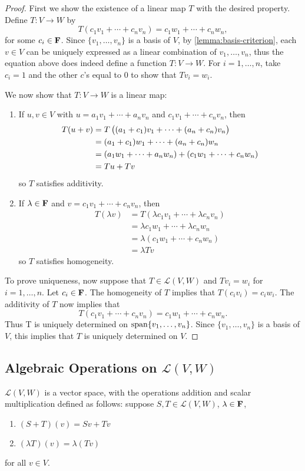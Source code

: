 \begin{proof}
First we show the existence of a linear map $T$ with the desired property. Define $T:V\to W$ by
\[T(c_1v_1+\cdots+c_nv_n)=c_1w_1+\cdots+c_nw_n,\]
for some $c_i\in\mathbf F$. Since $\{v_1,\dots,v_n\}$ is a basis of $V$, by \cref{lemma:basis-criterion}, each $v\in V$ can be uniquely expressed as a linear combination of $v_1,\dots,v_n$, thus the equation above does indeed define a function $T:V\to W$. For $i=1,\dots,n$, take $c_i=1$ and the other $c$'s equal to $0$ to show that $Tv_i=w_i$.

We now show that $T:V\to W$ is a linear map:
\begin{enumerate}[label=(\roman*)]
\item If $u,v\in V$ with $u=a_1v_1+\cdots+a_nv_n$ and $c_1v_1+\cdots+c_nv_n$, then
\begin{align*}
T(u+v)&=T\left((a_1+c_1)v_1+\cdots+(a_n+c_n)v_n\right)\\
&=(a_1+c_1)w_1+\cdots+(a_n+c_n)w_n\\
&=(a_1w_1+\cdots+a_nw_n)+(c_1w_1+\cdots+c_nw_n)\\
&=Tu+Tv
\end{align*}
so $T$ satisfies additivity.

\item If $\lambda\in\mathbf F$ and $v=c_1v_1+\cdots+c_nv_n$, then
\begin{align*}
T(\lambda v)&=T(\lambda c_1v_1+\cdots+\lambda c_nv_n)\\
&=\lambda c_1w_1+\cdots+\lambda c_nw_n\\
&=\lambda(c_1w_1+\cdots+c_nw_n)\\
&=\lambda Tv
\end{align*}
so $T$ satisfies homogeneity.
\end{enumerate}

To prove uniqueness, now suppose that $T\in\mathcal{L}(V,W)$ and $Tv_i=w_i$ for $i=1,\dots,n$. Let $c_i\in\mathbf F$. The homogeneity of $T$ implies that $T(c_iv_i)=c_iw_i$. The additivity of $T$ now implies that 
\[T(c_1v_1+\cdots+c_nv_n)=c_1w_1+\cdots+c_nw_n.\]
Thus T is uniquely determined on $\operatorname{span}\{v_1,\dots,v_n\}$. Since $\{v_1,\dots,v_n\}$ is a basis of $V$, this implies that $T$ is uniquely determined on $V$.
\end{proof}

\subsection{Algebraic Operations on $\mathcal{L}(V,W)$}
\begin{proposition}
$\mathcal{L}(V,W)$ is a vector space, with the operations addition and scalar multiplication defined as follows: suppose $S,T\in\mathcal{L}(V,W)$, $\lambda\in\mathbf F$,
\begin{enumerate}[label=(\roman*)]
\item $(S+T)(v)=Sv+Tv$
\item $(\lambda T)(v)=\lambda(Tv)$
\end{enumerate}
for all $v\in V$.
\end{proposition}

